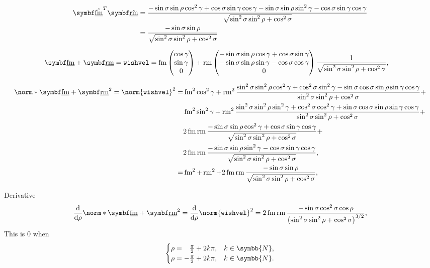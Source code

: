 \begin{align*}
\uvec{\flat{\fmove}}^T \uvec{\flat{\rmove}} &= \frac{-\sin\sigma\sin\rho\cos^2\gamma + \cos\sigma\sin\gamma\cos\gamma - \sin\sigma\sin\rho\sin^2\gamma - \cos\sigma\sin\gamma\cos\gamma}{\sqrt{\sin^2\sigma\sin^2\rho + \cos^2\sigma}}\\
&= \frac{-\sin\sigma\sin\rho}{\sqrt{\sin^2\sigma\sin^2\rho + \cos^2\sigma}}
\end{align*}

\begin{align*}
\vec{\flat{\fmove}} + \vec{\flat{\rmove}} = \texttt{wishvel} &= \fmove
\begin{pmatrix}
	\cos\gamma\\
	\sin\gamma\\
	0
\end{pmatrix} + \rmove
\begin{pmatrix}
	-\sin\sigma\sin\rho\cos\gamma + \cos\sigma\sin\gamma\\
	-\sin\sigma\sin\rho\sin\gamma - \cos\sigma\cos\gamma\\
	0
\end{pmatrix} \frac{1}{\sqrt{\sin^2\sigma\sin^2\rho + \cos^2\sigma}},
\end{align*}

\begin{align*}
\norm*{\vec{\flat{\fmove}} + \vec{\flat{\rmove}}}^2 = \norm{\texttt{wishvel}}^2 = &\fmove^2 \cos^2\gamma + \rmove^2 \frac{\sin^2\sigma\sin^2\rho\cos^2\gamma + \cos^2\sigma\sin^2\gamma - \sin\sigma\cos\sigma\sin\rho\sin\gamma\cos\gamma}{\sin^2\sigma\sin^2\rho + \cos^2\sigma} +\\
&\fmove^2 \sin^2\gamma + \rmove^2 \frac{\sin^2\sigma\sin^2\rho\sin^2\gamma + \cos^2\sigma\cos^2\gamma + \sin\sigma\cos\sigma\sin\rho\sin\gamma\cos\gamma}{\sin^2\sigma\sin^2\rho + \cos^2\sigma} +\\
&2\fmove\rmove\frac{-\sin\sigma\sin\rho\cos^2\gamma + \cos\sigma\sin\gamma\cos\gamma}{\sqrt{\sin^2\sigma\sin^2\rho + \cos^2\sigma}} +\\
&2\fmove\rmove\frac{-\sin\sigma\sin\rho\sin^2\gamma - \cos\sigma\sin\gamma\cos\gamma}{\sqrt{\sin^2\sigma\sin^2\rho + \cos^2\sigma}},\\
%
= &\fmove^2 + \rmove^2 + 2\fmove\rmove\frac{-\sin\sigma\sin\rho}{\sqrt{\sin^2\sigma\sin^2\rho + \cos^2\sigma}},
\end{align*}

Derivative
\begin{align*}
\frac{\mathrm{d}}{\mathrm{d}\rho} \norm*{\vec{\flat{\fmove}} + \vec{\flat{\rmove}}}^2 = \frac{\mathrm{d}}{\mathrm{d}\rho} \norm{\texttt{wishvel}}^2 = 2\fmove\rmove\frac{-\sin\sigma\cos^2\sigma\cos\rho}{\left( \sin^2\sigma\sin^2\rho + \cos^2\sigma \right)^{3/2}},
\end{align*}
This is $0$ when
\[
\begin{cases}
	\rho = \hphantom{-}\frac{\pi}{2} + 2k\pi, &k \in \symbb{N},\\
	\rho = -\frac{\pi}{2} + 2k\pi, &k \in \symbb{N}.
\end{cases}
\]

